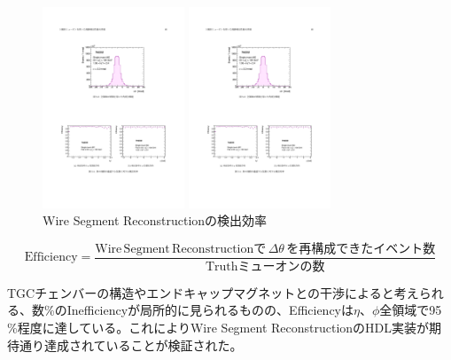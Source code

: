 \begin{figure}
    \begin{minipage}[b]{.5\linewidth}
    \centering
    \includegraphics[height=6cm]{fig/Test/Vivado_Wire_eta.pdf}
    \end{minipage}%
    \begin{minipage}[b]{.5\linewidth}
    \centering
    \includegraphics[height=6cm]{fig/Test/Vivado_Wire_phi.pdf}
    \end{minipage}%
    \caption[Wire Segment Reconstructionの検出効率]{Wire Segment Reconstructionの検出効率\cite{mt_nabeyama}}
    \label{Vivado_Wire_Efficiency}
    \end{figure}
    
    \begin{equation}
    \mathrm{Efficiency} = \frac{\mathrm{Wire \,Segment \,Reconstructionで}\,\Delta\theta\,\mathrm{を再構成できたイベント数}}{\mathrm{Truth ミューオン の数}}
\end{equation}

TGCチェンバーの構造やエンドキャップマグネットとの干渉によると考えられる、数\%のInefficiencyが局所的に見られるものの、Efficiencyは$\eta$、$\phi$全領域で95 \%程度に達している。これによりWire Segment ReconstructionのHDL実装が期待通り達成されていることが検証された。

